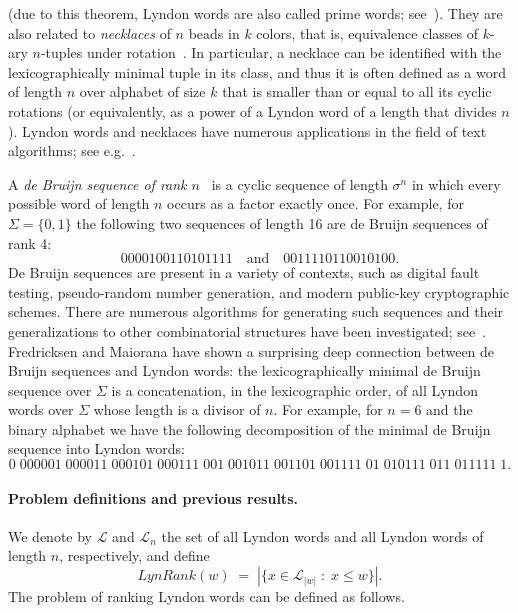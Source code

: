 \documentclass{article}
\renewcommand{\L}{{\mathcal{L}}}
\newcommand{\Lynd}{\mathit{LynRank}}
\theoremstyle{definition}
\theoremstyle{remark}
\begin{document}
(due to this theorem, Lyndon words are also called prime words; see~\cite{Knuth}).
They are also related to \emph{necklaces} of $n$ beads in $k$ colors, that is, equivalence classes of $k$-ary
$n$-tuples under rotation~\cite{FK,fredricksen1978necklaces}.
In particular, a necklace can be identified with the lexicographically minimal tuple in its class, 
and thus it is often defined as a word of length $n$ over alphabet of size $k$ that is smaller than or equal to all its cyclic rotations
(or equivalently, as a power of a Lyndon word of a length that divides $n$).
Lyndon words and necklaces have numerous applications in the field of text algorithms;
see e.g.\ \cite{DBLP:conf/dlt/BonomoMRRS13,ApplicationsOfRuns,TextAlgorithms,DBLP:conf/soda/Mucha13}.

A \emph{de Bruijn sequence of rank $n$}~\cite{deBruijn} is a cyclic sequence of length $\sigma^n$
in which every possible word of length $n$ occurs as a factor exactly once.
For example, for $\Sigma=\{0,1\}$ the following two sequences of length 16 are de Bruijn
sequences of rank 4:
$$0000100110101111 \quad\mbox{and}\quad 0011110110010100.$$
De Bruijn sequences are present in a variety of contexts, such as digital fault testing,
pseudo-random number generation, and modern public-key cryptographic schemes.
There are numerous algorithms for generating such sequences and their generalizations
to other combinatorial structures have been investigated; see~\cite{deBruijnAnalogs,Knuth}.
Fredricksen and Maiorana \cite{DBLP:journals/jct/Fredricksen70,fredricksen1978necklaces} have shown a surprising
deep connection between de Bruijn sequences and Lyndon words:
the lexicographically minimal de Bruijn sequence over $\Sigma$ is a concatenation,
in the lexicographic order, of all Lyndon words over $\Sigma$ whose length is a divisor of $n$.
For example, for $n=6$ and the binary alphabet we have the following decomposition of the minimal
de Bruijn sequence into Lyndon words:
$$0\; 000001\; 000011\; 000101\; 000111\; 001\; 001011\; 001101\; 001111\; 01\; 010111\; 011\; 011111\; 1.$$

\paragraph{\bf Problem definitions and previous results.}
We denote by $\L$ and $\L_n$ the set of all Lyndon words and
all Lyndon words of length $n$, respectively, and define
$$\Lynd(w)\;=\; |\{x \in \L_{|w|}\;:\; x\le w\}|.$$
The problem of ranking Lyndon words can be defined as follows.
\end{document}
